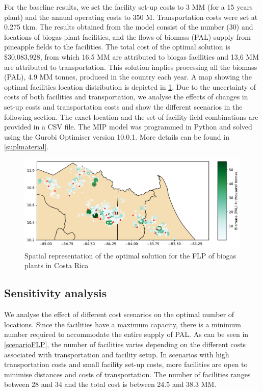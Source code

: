 For the baseline results, we set the facility set-up costs to 3 MM (for a 15 years plant) and the annual operating costs to 350 M. Transportation costs were set at 0.275 tkm. The results obtained from the model consist of the number (30) and locations of biogas plant facilities, and the flows of biomass (PAL) supply from pineapple fields to the facilities. The total cost of the optimal solution is \$30,083,928, from which 16.5 MM are attributed to biogas facilities and 13,6 MM are attributed to transportation. This solution implies processing all the biomass (PAL), 4.9 MM tonnes, produced in the country each year. A map showing the optimal facilities location distribution is depicted in \cref{solutionMAP}. Due to the uncertainty of costs of both facilities and transportation, we analyse the effects of changes in set-up costs and transportation costs and show the different scenarios in the following section. The exact location and the set of facility-field combinations are provided in a CSV file. The MIP model was programmed in Python and solved using the Gurobi Optimiser version 10.0.1. More details can be found in \cref{suplmaterial}. 

\begin{figure}[!ht]
\caption[Spatial representation of the optimal solution for the FLP]{Spatial representation of the optimal solution for the FLP of biogas plants in Costa Rica}
\label{solutionMAP}
\centering
\includegraphics[width=\textwidth]{fig/resultsALL.pdf}
\end{figure}


\subsection{Sensitivity analysis}

We analyse the effect of different cost scenarios on the optimal number of locations. Since the facilities have a maximum capacity, there is a minimum number required to accommodate the entire supply of PAL. As can be seen in \cref{scenarioFLP}, the number of facilities varies depending on the different costs associated with transportation and facility setup. In scenarios with high transportation costs and small facility set-up costs, more facilities are open to minimise distances and costs of transportation. The number of facilities ranges between 28 and 34 and the total cost is between 24.5 and 38.3 MM. 

